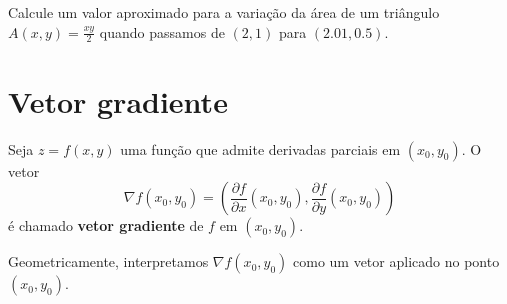 \begin{exercise}
    Calcule um valor aproximado para a variação da área de um triângulo \(A(x,y) = \frac{xy}{2}\) quando passamos de \((2,1)\) para \((2.01,0.5)\).
\end{exercise}

\section{Vetor gradiente}

\begin{definition}
    Seja \(z = f(x,y)\) uma função que admite derivadas parciais em \((x_0,y_0)\). O vetor \[\nabla f(x_0,y_0) = \left( \frac{\partial f}{\partial x}(x_0,y_0), \frac{\partial f}{\partial y}(x_0,y_0) \right)\] é chamado \textbf{vetor gradiente} de \(f\) em \((x_0,y_0)\).
\end{definition}

Geometricamente, interpretamos \(\nabla f(x_0,y_0)\) como um vetor aplicado no ponto \((x_0,y_0)\).


